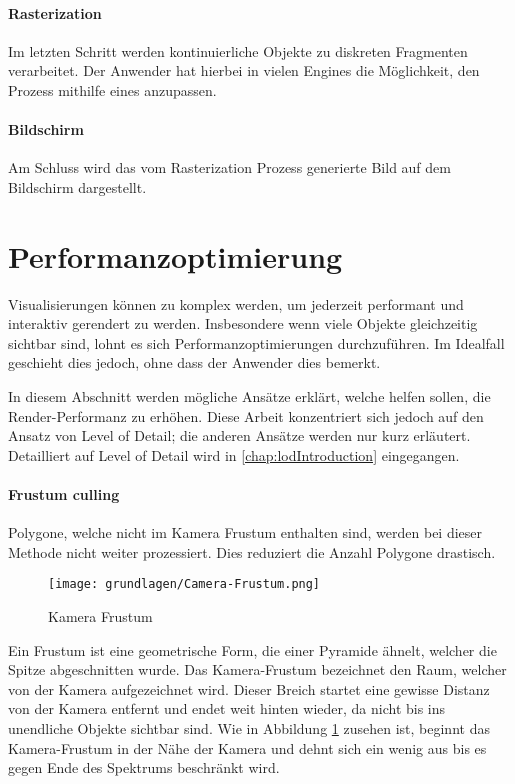 \paragraph{Rasterization}
Im letzten Schritt werden kontinuierliche Objekte zu diskreten Fragmenten verarbeitet. Der Anwender hat hierbei in vielen Engines die Möglichkeit, den Prozess mithilfe eines  anzupassen.

\paragraph{Bildschirm}
Am Schluss wird das vom Rasterization Prozess generierte Bild auf dem Bildschirm dargestellt.

\section{Performanzoptimierung}
Visualisierungen können zu komplex werden, um jederzeit performant und interaktiv gerendert zu werden.
Insbesondere wenn viele Objekte gleichzeitig sichtbar sind, lohnt es sich Performanzoptimierungen durchzuführen.
Im Idealfall geschieht dies jedoch, ohne dass der Anwender dies bemerkt.

In diesem Abschnitt werden mögliche Ansätze erklärt, welche helfen sollen, die Render-Performanz zu erhöhen. Diese Arbeit konzentriert sich jedoch auf den Ansatz von Level of Detail; die anderen Ansätze werden nur kurz erläutert. Detailliert auf Level of Detail wird in \autoref{chap:lodIntroduction} eingegangen.

\paragraph{Frustum culling}
Polygone, welche nicht im Kamera Frustum enthalten sind, werden bei dieser Methode nicht weiter prozessiert.
Dies reduziert die Anzahl Polygone drastisch.

\begin{figure}[H]
  \centering
  \texttt{[image: grundlagen/Camera-Frustum.png]}
  \caption{Kamera Frustum}
  \label{fig:CameraFrustum}
\end{figure}

Ein Frustum ist eine geometrische Form, die einer Pyramide ähnelt, welcher die Spitze abgeschnitten wurde.
Das Kamera-Frustum bezeichnet den Raum, welcher von der Kamera aufgezeichnet wird. Dieser Breich startet eine gewisse Distanz von der Kamera entfernt und endet weit hinten wieder, da nicht bis ins unendliche Objekte sichtbar sind.
Wie in Abbildung \ref{fig:CameraFrustum} zusehen ist, beginnt das Kamera-Frustum in der Nähe der Kamera und dehnt sich ein wenig aus bis es gegen Ende des Spektrums beschränkt wird.

